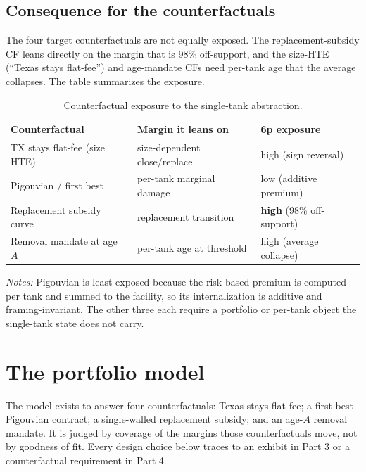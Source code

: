 \documentclass[
  letterpaper,
  DIV=11,
  numbers=noendperiod]{scrartcl}
\begin{document}
\subsection{Consequence for the
counterfactuals}\label{consequence-for-the-counterfactuals}

The four target counterfactuals are not equally exposed. The
replacement-subsidy CF leans directly on the margin that is 98\%
off-support, and the size-HTE (``Texas stays flat-fee'') and age-mandate
CFs need per-tank age that the average collapses. The table summarizes
the exposure.

\begin{table}[H]
\centering
\caption{Counterfactual exposure to the single-tank abstraction.}
\begin{tabular}{@{}lll@{}}
\toprule
Counterfactual & Margin it leans on & 6p exposure \\
\midrule
TX stays flat-fee (size HTE) & size-dependent close/replace & high (sign reversal) \\
Pigouvian / first best & per-tank marginal damage & low (additive premium) \\
Replacement subsidy curve & replacement transition & \textbf{high} (98\% off-support) \\
Removal mandate at age $A$ & per-tank age at threshold & high (average collapse) \\
\bottomrule
\end{tabular}
\end{table}

\noindent\textit{Notes:} Pigouvian is least exposed because the
risk-based premium is computed per tank and summed to the facility, so
its internalization is additive and framing-invariant. The other three
each require a portfolio or per-tank object the single-tank state does
not carry.

\newpage

\section{The portfolio model}\label{the-portfolio-model}

The model exists to answer four counterfactuals: Texas stays flat-fee; a
first-best Pigouvian contract; a single-walled replacement subsidy; and
an age-\(A\) removal mandate. It is judged by coverage of the margins
those counterfactuals move, not by goodness of fit. Every design choice
below traces to an exhibit in Part 3 or a counterfactual requirement in
Part 4.
\end{document}
